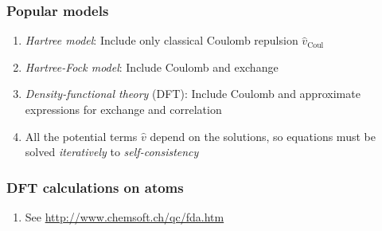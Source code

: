 \documentclass[11pt]{article}
\begin{document}
\subsubsection{Popular models}
\label{sec:org8222f6b}
\begin{enumerate}
\item \emph{Hartree model}: Include only classical Coulomb repulsion \(\hat v_\mathrm{Coul}\)
\item \emph{Hartree-Fock model}: Include Coulomb and exchange
\item \emph{Density-functional theory} (DFT): Include Coulomb and
approximate expressions for exchange and correlation
\item All the potential terms \(\hat v\) depend on the solutions, so equations
must be solved \emph{iteratively} to \emph{self-consistency}
\end{enumerate}
\subsubsection{DFT calculations on atoms}
\label{sec:org9b26a9a}
\begin{enumerate}
\item See \url{http://www.chemsoft.ch/qc/fda.htm}
\end{enumerate}
\end{document}
